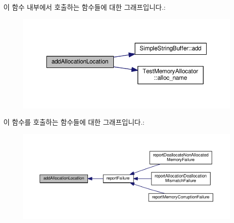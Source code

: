 이 함수 내부에서 호출하는 함수들에 대한 그래프입니다.\+:
\nopagebreak
\begin{figure}[H]
\begin{center}
\leavevmode
\includegraphics[width=348pt]{class_memory_leak_output_string_buffer_a5f6e2b7ab5d4600d3a3c829c1ec6faa7_cgraph}
\end{center}
\end{figure}




이 함수를 호출하는 함수들에 대한 그래프입니다.\+:
\nopagebreak
\begin{figure}[H]
\begin{center}
\leavevmode
\includegraphics[width=350pt]{class_memory_leak_output_string_buffer_a5f6e2b7ab5d4600d3a3c829c1ec6faa7_icgraph}
\end{center}
\end{figure}


